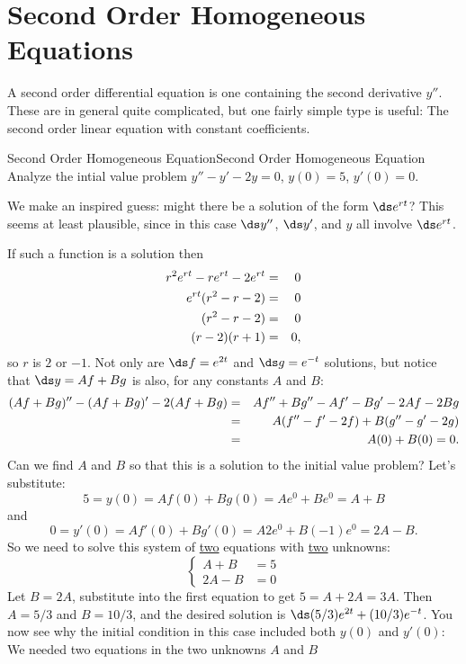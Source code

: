 \section{Second Order Homogeneous Equations}{}{}\label{sec:second order homogeneous}
A second order differential equation is one containing the second
derivative $y''$. These are in general quite complicated, but one fairly
simple type is useful: The second order linear equation with constant
coefficients. 

\begin{example}{Second Order Homogeneous Equation}{Second Order Homogeneous Equation}\label{Second Order Homogeneous Equation}
Analyze the intial value problem $y''-y'-2y=0$,
$y(0)=5$, $y'(0)=0$. 
\end{example}

\begin{solution}
We make an inspired guess: might there be a
solution of the form $\ds e^{rt}$? This seems at least plausible,
since in this case $\ds y''$, $\ds y'$, and $y$ all
involve $\ds e^{rt}$. 

If such a function is a solution then
\begin{eqnarray*}
r^2 e^{rt}-r e^{rt}-2e^{rt}&=&0\cr
e^{rt}(r^2-r-2)&=&0\cr
(r^2-r-2)&=&0\cr
(r-2)(r+1)&=&0,
\end{eqnarray*}
so $r$ is $2$ or $-1$. Not only are $\ds f=e^{2t}$ and $\ds g=e^{-t}$
solutions, but notice that $\ds y=Af+Bg$ is also, for any constants $A$
and $B$:
\begin{eqnarray*}
(Af+Bg)''-(Af+Bg)'-2(Af+Bg)&=&Af''+Bg''-Af'-Bg'-2Af-2Bg\cr
&=&A(f''-f'-2f)+B(g''-g'-2g)\cr
&=&A(0)+B(0)=0.
\end{eqnarray*}
Can we find $A$ and $B$ so that this is a solution to the initial
value problem? Let's substitute:
$$
5=y(0)=Af(0)+Bg(0)=Ae^0+Be^0=A+B
$$
and 
$$0=y'(0)=Af'(0)+Bg'(0)=A2e^{0}+B(-1)e^0=2A-B.$$
So we need to solve this system of \underline{two} equations with \underline{two} unknowns:
\[
\left\{
\begin{array}{ll}
A+B	&	=5	\\
2A-B	&	=0
\end{array}
\right.
\]
Let $B=2A$, substitute into the first equation to get $5=A+2A=3A$. Then $A=5/3$ and $B=10/3$, and the
desired solution is $\ds (5/3)e^{2t}+(10/3)e^{-t}$. You now see why
the initial condition in this case included both $y(0)$ and $y'(0)$:
We needed two equations in the two unknowns $A$ and $B$
\end{solution}

